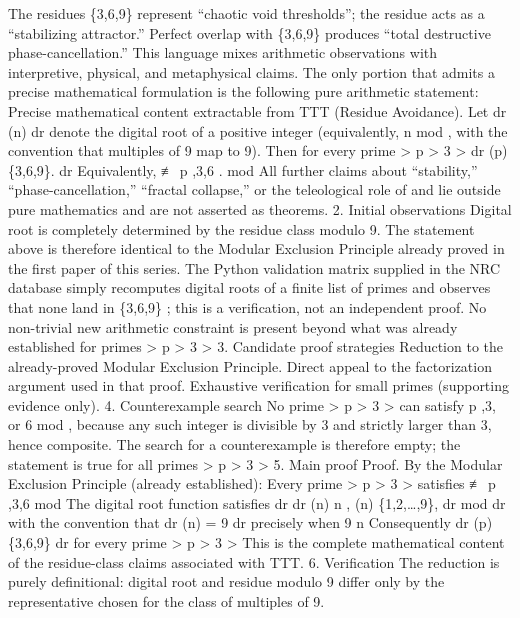 The residues
\{3,6,9\}
represent “chaotic void thresholds”; the residue
acts as a “stabilizing attractor.”
Perfect overlap with
\{3,6,9\}
produces “total destructive phase-cancellation.”
This language mixes arithmetic observations with interpretive, physical, and metaphysical claims. The only portion that admits a precise mathematical formulation is the following pure arithmetic statement:
Precise mathematical content extractable from TTT (Residue Avoidance).
Let
dr
(n)
dr
denote the digital root of a positive integer
(equivalently,
n 
mod
, with the convention that multiples of 9 map to 9).
Then for every prime
>
p > 3
>
dr
(p) \notin \{3,6,9\}.
dr
Equivalently,
≢
p \not{},3,6 .
mod
All further claims about “stability,” “phase-cancellation,” “fractal collapse,” or the teleological role of
\varphi
and
\pi
lie outside pure mathematics and are not asserted as theorems.
2. Initial observations
Digital root is completely determined by the residue class modulo 9.
The statement above is therefore identical to the Modular Exclusion Principle already proved in the first paper of this series.
The Python validation matrix supplied in the NRC database simply recomputes digital roots of a finite list of primes and observes that none land in
\{3,6,9\}
; this is a verification, not an independent proof.
No non-trivial new arithmetic constraint is present beyond what was already established for primes
>
p > 3
>
3. Candidate proof strategies
Reduction to the already-proved Modular Exclusion Principle.
Direct appeal to the factorization argument used in that proof.
Exhaustive verification for small primes (supporting evidence only).
4. Counterexample search
No prime
>
p > 3
>
can satisfy
p ,3,
or
6 
mod
, because any such integer is divisible by 3 and strictly larger than 3, hence composite.
The search for a counterexample is therefore empty; the statement is true for all primes
>
p > 3
>
5. Main proof
Proof.
By the Modular Exclusion Principle (already established):
Every prime
>
p > 3
>
satisfies
≢
p \not{},3,6 
mod
The digital root function satisfies
dr
dr
(n) \equiv n , \qquad
{}(n) \in \{1,2,\dots,9\},
dr
mod
dr
with the convention that
dr
(n) = 9
dr
precisely when
9 \mid n
Consequently
dr
(p) \notin \{3,6,9\}
dr
for every prime
>
p > 3
>
This is the complete mathematical content of the residue-class claims associated with TTT.
6. Verification
The reduction is purely definitional: digital root and residue modulo 9 differ only by the representative chosen for the class of multiples of 9.
